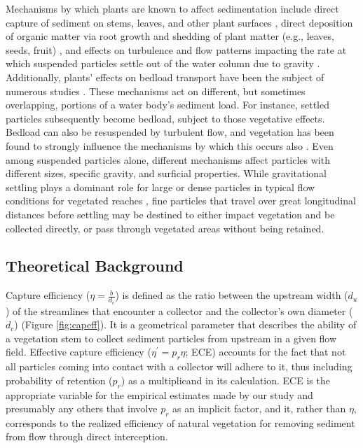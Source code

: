 \documentclass[geosciences,article,submit,moreauthors,pdftex]{Definitions/mdpi}
\begin{document}
Mechanisms by which plants are known to affect sedimentation include direct capture of sediment on stems, leaves, and other plant surfaces \cite{mudd2010does}, direct deposition of organic matter via root growth and shedding of plant matter (e.g., leaves, seeds, fruit) \cite{nyman2006marsh, neubauer2008contributions}, and effects on turbulence and flow patterns impacting the rate at which suspended particles settle out of the water column due to gravity \cite{christiansen2000flow, leonard1995flow}. Additionally, plants' effects on bedload transport have been the subject of numerous studies \cite[e.g.,][]{yager2013influence, yang2019impact, jordanova2003experimental}. These mechanisms act on different, but sometimes overlapping, portions of a water body's sediment load. For instance, settled particles subsequently become bedload, subject to those vegetative effects. Bedload can also be resuspended by turbulent flow, and vegetation has been found to strongly influence the mechanisms by which this occurs also \cite{tinoco2018turbulence}. Even among suspended particles alone, different mechanisms affect particles with different sizes, specific gravity, and surficial properties. While gravitational settling plays a dominant role for large or dense particles in typical flow conditions for vegetated reaches \cite{mudd2010does, leonard1995flow}, fine particles that travel over great longitudinal distances before settling may be destined to either impact vegetation and be collected directly, or pass through vegetated areas without being retained.

\subsection{Theoretical Background}

Capture efficiency ($\eta=\frac{b}{d_c}$) is defined as the ratio between the upstream width ($d_u$) of the streamlines that encounter a collector and the collector's own diameter ($d_c$) (Figure \ref{fig:capeff}). It is a geometrical parameter that describes the ability of a vegetation stem to collect sediment particles from upstream in a given flow field. Effective capture efficiency ($\eta^\prime=p_r\eta$; ECE) accounts for the fact that not all particles coming into contact with a collector will adhere to it, thus including probability of retention ($p_r$) as a multiplicand in its calculation. ECE is the appropriate variable for the empirical estimates made by our study and presumably any others that involve $p_r$ as an implicit factor, and it, rather than $\eta$, corresponds to the realized efficiency of natural vegetation for removing sediment from flow through direct interception.
\end{document}

